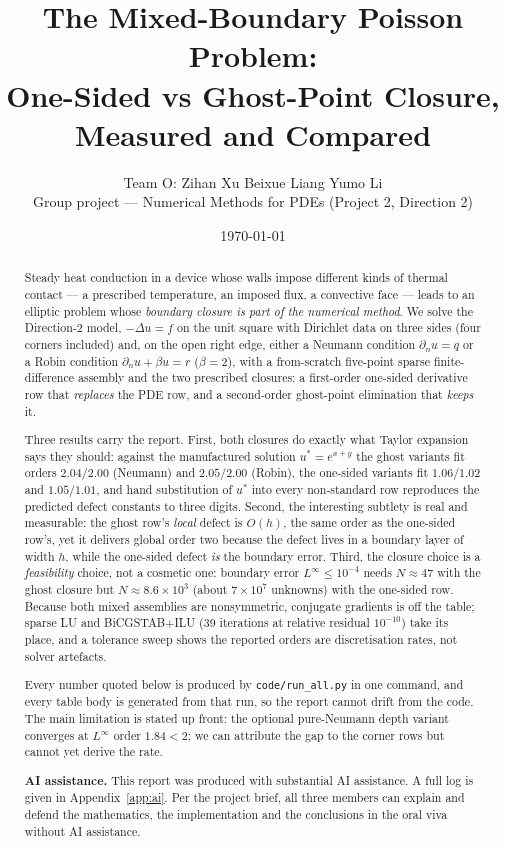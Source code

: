 \documentclass[11pt,a4paper]{article}
\title{\vspace{-1.6cm}\bfseries The Mixed-Boundary Poisson Problem:\\[2pt]
One-Sided vs Ghost-Point Closure, Measured and Compared}
\author{%
  Team O: Zihan Xu \quad Beixue Liang \quad Yumo Li\\[2pt]
  \small Group project --- Numerical Methods for PDEs (Project 2, Direction 2)}
\date{\today}
\begin{document}
\maketitle
\thispagestyle{empty}

\begin{abstract}
\noindent
Steady heat conduction in a device whose walls impose different kinds of
thermal contact --- a prescribed temperature, an imposed flux, a convective
face --- leads to an elliptic problem whose \emph{boundary closure is part of
the numerical method}. We solve the Direction-2 model, $-\Delta u = f$ on the
unit square with Dirichlet data on three sides (four corners included) and, on
the open right edge, either a Neumann condition $\partial_n u = q$ or a Robin
condition $\partial_n u + \beta u = r$ ($\beta = 2$), with a from-scratch
five-point sparse finite-difference assembly and the two prescribed closures:
a first-order one-sided derivative row that \emph{replaces} the PDE row, and a
second-order ghost-point elimination that \emph{keeps} it.

Three results carry the report. First, both closures do exactly what Taylor
expansion says they should: against the manufactured solution $u^*=e^{x+y}$
the ghost variants fit orders $2.04$/$2.00$ (Neumann) and $2.05$/$2.00$
(Robin), the one-sided variants fit $1.06$/$1.02$ and $1.05$/$1.01$, and
hand substitution of $u^*$ into every non-standard row reproduces the
predicted defect constants to three digits. Second, the interesting subtlety
is real and measurable: the ghost row's \emph{local} defect is $O(h)$, the
same order as the one-sided row's, yet it delivers global order two because
the defect lives in a boundary layer of width $h$, while the one-sided defect
\emph{is} the boundary error. Third, the closure choice is a
\emph{feasibility} choice, not a cosmetic one: boundary error
$L^\infty \le 10^{-4}$ needs $N \approx 47$ with the ghost closure but
$N \approx 8.6\times10^{3}$ (about $7\times10^7$ unknowns) with the one-sided
row. Because both mixed assemblies are nonsymmetric, conjugate gradients is
off the table; sparse LU and BiCGSTAB+ILU (39 iterations at relative residual
$10^{-10}$) take its place, and a tolerance sweep shows the reported orders
are discretisation rates, not solver artefacts.

Every number quoted below is produced by \texttt{code/run\_all.py} in one
command, and every table body is generated from that run, so the report
cannot drift from the code. The main limitation is stated up front: the
optional pure-Neumann depth variant converges at $L^\infty$ order $1.84 < 2$;
we can attribute the gap to the corner rows but cannot yet derive the rate.

\medskip
\noindent\textbf{AI assistance.} This report was produced with substantial AI
assistance. A full log is given in Appendix~\ref{app:ai}. Per the project
brief, all three members can explain and defend the mathematics, the
implementation and the conclusions in the oral viva without AI assistance.
\end{abstract}
\end{document}
